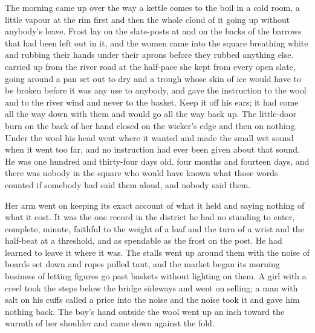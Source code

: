 
The morning came up over  the way a kettle comes to the boil in a cold room, a little vapour at the rim first and then the whole cloud of it going up without anybody's leave. Frost lay on the slate-posts at  and on the backs of the barrows that had been left out in it, and the women came into the square breathing white and rubbing their hands under their aprons before they rubbed anything else.  carried  up from the river road at the half-pace she kept from every open slate, going around a pan set out to dry and a trough whose skin of ice would have to be broken before it was any use to anybody, and gave the instruction to the wool and to the river wind and never to the basket. Keep it off his ears; it had come all the way down with them and would go all the way back up. The little-door burn on the back of her hand closed on the wicker's edge and then on nothing. Under the wool his head went where it wanted and made the small wet sound when it went too far, and no instruction had ever been given about that sound. He was one hundred and thirty-four days old, four months and fourteen days, and there was nobody in the square who would have known what those words counted if somebody had said them aloud, and nobody said them.

Her arm went on keeping its exact account of what it held and saying nothing of what it cost. It was the one record in the district he had no standing to enter, complete, minute, faithful to the weight of a loaf and the turn of a wrist and the half-beat at a threshold, and as spendable as the frost on the post. He had learned to leave it where it was. The stalls went up around them with the noise of boards set down and ropes pulled taut, and the market began its morning business of letting figures go past baskets without lighting on them. A girl with a creel took the steps below the bridge sideways and went on selling; a man with salt on his cuffs called a price into the noise and the noise took it and gave him nothing back. The boy's hand outside the wool went up an inch toward the warmth of her shoulder and came down against the fold.

